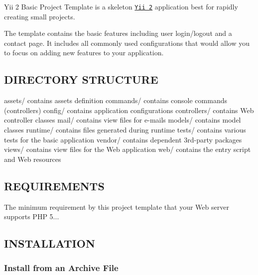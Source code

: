 Yii 2 Basic Project Template is a skeleton \href{http://www.yiiframework.com/}{\tt Yii 2} application best for rapidly creating small projects.

The template contains the basic features including user login/logout and a contact page. It includes all commonly used configurations that would allow you to focus on adding new features to your application.

\href{https://packagist.org/packages/yiisoft/yii2-app-basic}{\tt } \href{https://packagist.org/packages/yiisoft/yii2-app-basic}{\tt } \href{https://travis-ci.org/yiisoft/yii2-app-basic}{\tt }

\subsection*{D\+I\+R\+E\+C\+T\+O\+RY S\+T\+R\+U\+C\+T\+U\+RE }

\begin{DoxyVerb}  assets/             contains assets definition
  commands/           contains console commands (controllers)
  config/             contains application configurations
  controllers/        contains Web controller classes
  mail/               contains view files for e-mails
  models/             contains model classes
  runtime/            contains files generated during runtime
  tests/              contains various tests for the basic application
  vendor/             contains dependent 3rd-party packages
  views/              contains view files for the Web application
  web/                contains the entry script and Web resources
\end{DoxyVerb}


\subsection*{R\+E\+Q\+U\+I\+R\+E\+M\+E\+N\+TS }

The minimum requirement by this project template that your Web server supports P\+HP 5...

\subsection*{I\+N\+S\+T\+A\+L\+L\+A\+T\+I\+ON }

\subsubsection*{Install from an Archive File}

